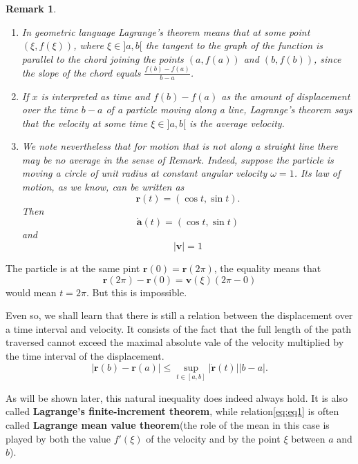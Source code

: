 \documentclass[a4paper,12pt]{article} %
\newtheorem*{remark}{Remark}
\begin{document}
\begin{remark}
    \normalfont
    \begin{enumerate}
        \item In geometric language Lagrange's theorem means that at some 
            point $(\xi, f(\xi))$, where $\xi \in ]a,b[$ the tangent to the 
            graph of the function is parallel to the chord joining the 
            points $(a,f(a))$ and $(b,f(b))$, since the slope of the chord equals 
            $\frac{f(b) - f(a)}{b - a}$.
        \item If $x$ is interpreted as time and $f(b) - f(a)$ as the amount of 
            displacement over the time $b - a$ of a particle moving along a line,
            Lagrange's theorem says that the velocity at some time $\xi \in ]a,b[$
            is the average velocity.
        \item We note nevertheless that for motion that is not along a straight 
            line there may be no average in the sense of Remark. Indeed, suppose 
            the particle is moving a circle of unit radius at constant angular 
            velocity $\omega = 1$. Its law of motion, as we know, can be written as 
            \[
                \bm{r}(t) = \left(\cos t, \sin t\right). 
                \]
            Then 
            \[
                \dot{\bm{a}}(t) = (\cos t, \sin t)
                \]
            and 
            \[
                \vert \bm{v} \vert = 1
                \]
    \end{enumerate}
\end{remark}

The particle is at the same pint $\bm{r}(0) = \bm{r}(2\pi)$, the equality 
means that 
\[
    \bm{r}(2\pi)  - \bm{r}(0) = \bm{v}(\xi)(2\pi - 0)
    \]
would mean $t=2\pi $. But this is impossible.

Even so, we shall learn that there is still a relation between the 
displacement over a time interval and velocity. It consists of the 
fact that the full length of the path traversed cannot exceed the 
maximal absolute vale of the velocity multiplied by the time interval 
of the displacement.
\begin{equation}
    \vert \bm{r}(b) - \bm{r}(a) \vert \le \sup_{t \in [a,b]} \vert 
    \dot{\bm{r}}(t)\vert \vert b-a\vert. 
\end{equation}

As will be shown later, this natural inequality does indeed always 
hold. It is also called \textbf{Lagrange's finite-increment theorem},
while relation\ref{eq:eq1} is often called \textbf{Lagrange mean value
theorem}(the role of the mean in this case is played by both the 
value $f'(\xi)$ of the velocity and by the point $\xi$ between $a$  and $b$).
\end{document}
